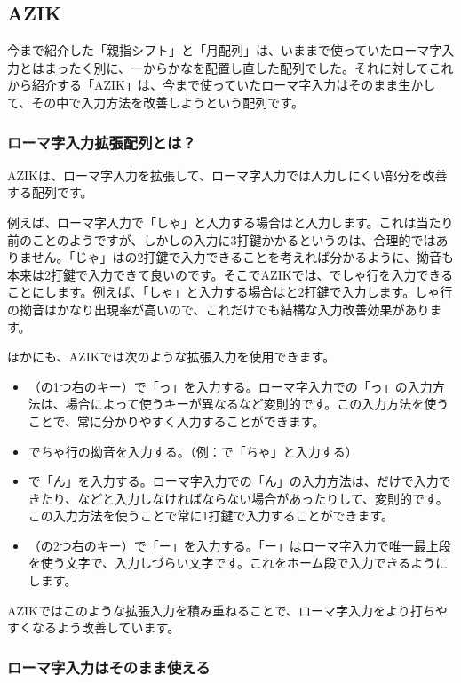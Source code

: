 \subsection{AZIK}

今まで紹介した「親指シフト」と「月配列」は、いままで使っていたローマ字入力とはまったく別に、一からかなを配置し直した配列でした。それに対してこれから紹介する「AZIK」は、今まで使っていたローマ字入力はそのまま生かして、その中で入力方法を改善しようという配列です。

\subsubsection*{ローマ字入力拡張配列とは？}

AZIKは、ローマ字入力を拡張して、ローマ字入力では入力しにくい部分を改善する配列です。

例えば、ローマ字入力で「しゃ」と入力する場合はと入力します。これは当たり前のことのようですが、しかしの入力に3打鍵かかるというのは、合理的ではありません。「じゃ」はの2打鍵で入力できることを考えれば分かるように、拗音も本来は2打鍵で入力できて良いのです。そこでAZIKでは、でしゃ行を入力できることにします。例えば、「しゃ」と入力する場合はと2打鍵で入力します。しゃ行の拗音はかなり出現率が高いので、これだけでも結構な入力改善効果があります。

ほかにも、AZIKでは次のような拡張入力を使用できます。
\begin{itemize}
 \item \key{;}（の1つ右のキー）で「っ」を入力する。ローマ字入力での「っ」の入力方法は、場合によって使うキーが異なるなど変則的です。この入力方法を使うことで、常に分かりやすく入力することができます。
 \item {}でちゃ行の拗音を入力する。（例：で「ちゃ」と入力する）
 \item {}で「ん」を入力する。ローマ字入力での「ん」の入力方法は、だけで入力できたり、などと入力しなければならない場合があったりして、変則的です。この入力方法を使うことで常に1打鍵で入力することができます。
 \item \key{:}（の2つ右のキー）で「ー」を入力する。「ー」はローマ字入力で唯一最上段を使う文字で、入力しづらい文字です。これをホーム段で入力できるようにします。
\end{itemize}
AZIKではこのような拡張入力を積み重ねることで、ローマ字入力をより打ちやすくなるよう改善しています。

\subsubsection*{ローマ字入力はそのまま使える}

